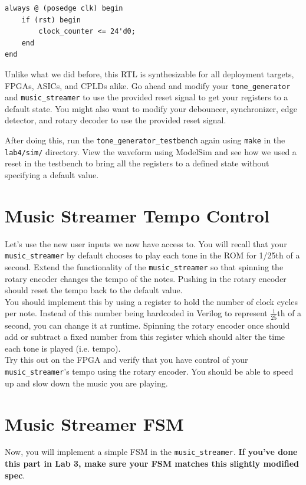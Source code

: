 \documentclass[11pt]{article}
\begin{document}
\begin{verbatim}
always @ (posedge clk) begin
	if (rst) begin
		clock_counter <= 24'd0;
	end
end
\end{verbatim}

Unlike what we did before, this RTL is synthesizable for all deployment targets, FPGAs, ASICs, and CPLDs alike. Go ahead and modify your \verb|tone_generator| and \verb|music_streamer| to use the provided reset signal to get your registers to a default state. You might also want to modify your debouncer, synchronizer, edge detector, and rotary decoder to use the provided reset signal.

After doing this, run the \verb|tone_generator_testbench| again using \verb|make| in the \verb|lab4/sim/| directory. View the waveform using ModelSim and see how we used a reset in the testbench to bring all the registers to a defined state without specifying a default value.

\section{Music Streamer Tempo Control}
Let's use the new user inputs we now have access to. You will recall that your \verb|music_streamer| by default chooses to play each tone in the ROM for 1/25th of a second. Extend the functionality of the \verb|music_streamer| so that spinning the rotary encoder changes the tempo of the notes. Pushing in the rotary encoder should reset the tempo back to the default value.\\

You should implement this by using a register to hold the number of clock cycles per note. Instead of this number being hardcoded in Verilog to represent $\frac{1}{25}$th of a second, you can change it at runtime. Spinning the rotary encoder once should add or subtract a fixed number from this register which should alter the time each tone is played (i.e. tempo).\\

Try this out on the FPGA and verify that you have control of your \verb|music_streamer|'s tempo using the rotary encoder. You should be able to speed up and slow down the music you are playing.

\section{Music Streamer FSM}
Now, you will implement a simple FSM in the \verb|music_streamer|. \textbf{If you've done this part in Lab 3, make sure your FSM matches this slightly modified spec}.
\end{document}
